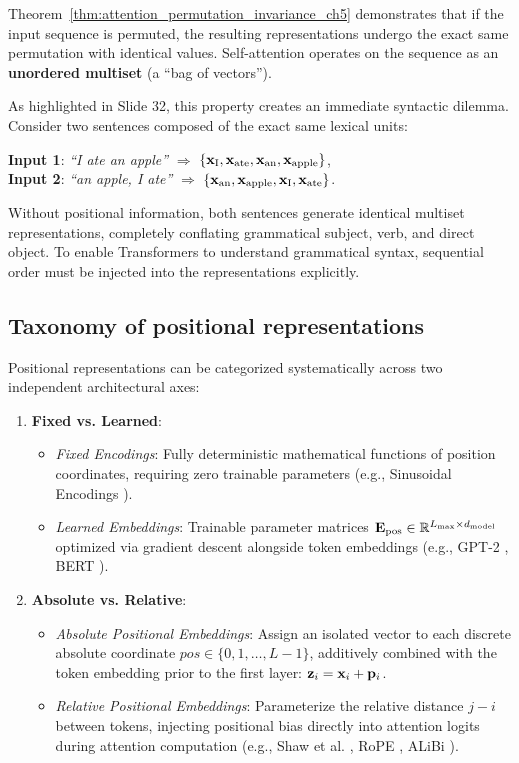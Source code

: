 \documentclass[../../main.tex]{subfiles}
\begin{document}
Theorem~\ref{thm:attention_permutation_invariance_ch5} demonstrates that if the input sequence is permuted, the resulting representations undergo the exact same permutation with identical values. Self-attention operates on the sequence as an \textbf{unordered multiset} (a ``bag of vectors'').

As highlighted in Slide 32, this property creates an immediate syntactic dilemma. Consider two sentences composed of the exact same lexical units:
\begin{center}
\textbf{Input 1}: \textit{``I ate an apple''} \quad $\Longrightarrow$ \quad $\{\mathbf{x}_{\text{I}}, \mathbf{x}_{\text{ate}}, \mathbf{x}_{\text{an}}, \mathbf{x}_{\text{apple}}\}$, \\
\textbf{Input 2}: \textit{``an apple, I ate''} \quad $\Longrightarrow$ \quad $\{\mathbf{x}_{\text{an}}, \mathbf{x}_{\text{apple}}, \mathbf{x}_{\text{I}}, \mathbf{x}_{\text{ate}}\}$.
\end{center}
Without positional information, both sentences generate identical multiset representations, completely conflating grammatical subject, verb, and direct object. To enable Transformers to understand grammatical syntax, sequential order must be injected into the representations explicitly.

\subsection{Taxonomy of positional representations}
\label{subsec:pe_taxonomy}

Positional representations can be categorized systematically across two independent architectural axes:
\begin{enumerate}
    \item \textbf{Fixed vs. Learned}:
    \begin{itemize}
        \item \emph{Fixed Encodings}: Fully deterministic mathematical functions of position coordinates, requiring zero trainable parameters (e.g., Sinusoidal Encodings \cite{vaswani2017}).
        \item \emph{Learned Embeddings}: Trainable parameter matrices $\mathbf{E}_{\text{pos}} \in \mathbb{R}^{L_{\max} \times d_{\text{model}}}$ optimized via gradient descent alongside token embeddings (e.g., GPT-2 \cite{radford2019}, BERT \cite{devlin2019}).
    \end{itemize}
    \item \textbf{Absolute vs. Relative}:
    \begin{itemize}
        \item \emph{Absolute Positional Embeddings}: Assign an isolated vector to each discrete absolute coordinate $pos \in \{0, 1, \dots, L-1\}$, additively combined with the token embedding prior to the first layer: $\mathbf{z}_i = \mathbf{x}_i + \mathbf{p}_i$.
        \item \emph{Relative Positional Embeddings}: Parameterize the relative distance $j - i$ between tokens, injecting positional bias directly into attention logits during attention computation (e.g., Shaw et al. \cite{shaw2018}, RoPE \cite{su2024roformer}, ALiBi \cite{press2022alibi}).
    \end{itemize}
\end{enumerate}
\end{document}
